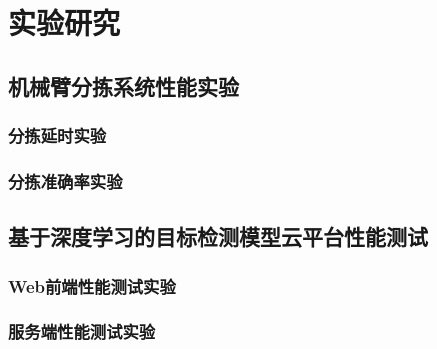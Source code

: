 \chapter{实验研究}

\section{机械臂分拣系统性能实验}

\subsection{分拣延时实验}

\subsection{分拣准确率实验}

\section{基于深度学习的目标检测模型云平台性能测试}

\subsection{Web前端性能测试实验}

\subsection{服务端性能测试实验}


